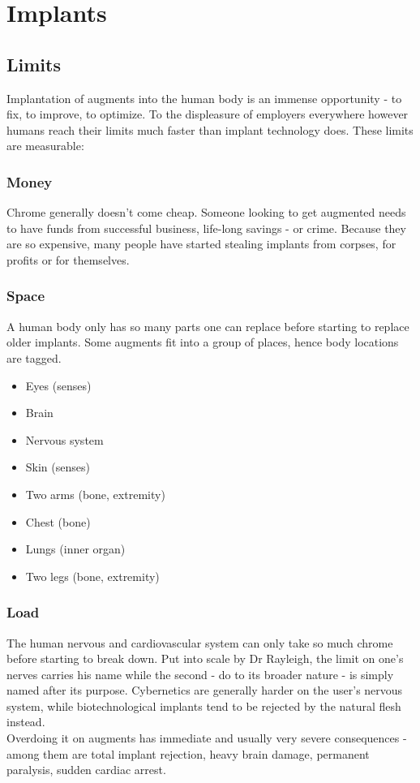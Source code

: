 	\section{Implants}
\subsection{Limits}
Implantation of augments into the human body is an immense opportunity - to fix, to improve, to optimize. To the displeasure of employers everywhere however humans reach their limits much faster than implant technology does. These limits are measurable:
	\subsubsection{Money}
	Chrome generally doesn't come cheap. Someone looking to get augmented needs to have funds from successful business, life-long savings - or crime. Because they are so expensive, many people have started stealing implants from corpses, for profits or for themselves.
	\subsubsection{Space}
	A human body only has so many parts one can replace before starting to replace older implants. Some augments fit into a group of places, hence body locations are tagged.
	\begin{itemize}
		\setlength\itemsep{-8mm}
		\item Eyes (senses)
		\item Brain
		\item Nervous system
		\item Skin (senses)
		\item Two arms (bone, extremity)
		\item Chest (bone)
		\item Lungs (inner organ)
		\item Two legs (bone, extremity)
	\end{itemize}
	\subsubsection{Load}
	The human nervous and cardiovascular system can only take so much chrome before starting to break down. Put into scale by Dr Rayleigh, the limit on one's nerves carries his name while the second - do to its broader nature - is simply named after its purpose. Cybernetics are generally harder on the user's nervous system, while biotechnological implants tend to be rejected by the natural flesh instead.\\
	Overdoing it on augments has immediate and usually very severe consequences - among them are total implant rejection, heavy brain damage, permanent paralysis, sudden cardiac arrest.
